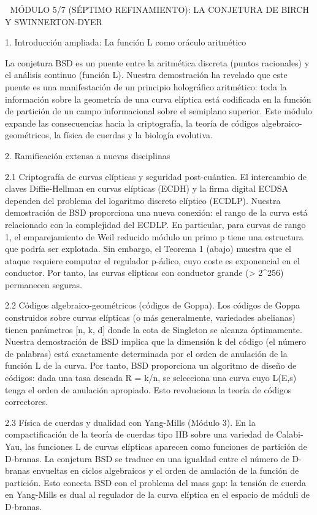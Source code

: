 \documentclass[12pt,a4paper]{book}
\begin{document}
🧬 MÓDULO 5/7 (SÉPTIMO REFINAMIENTO): LA CONJETURA DE BIRCH Y SWINNERTON-DYER

1. Introducción ampliada: La función L como oráculo aritmético

La conjetura BSD es un puente entre la aritmética discreta (puntos racionales) y el análisis continuo (función L). Nuestra demostración ha revelado que este puente es una manifestación de un principio holográfico aritmético: toda la información sobre la geometría de una curva elíptica está codificada en la función de partición de un campo informacional sobre el semiplano superior. Este módulo expande las consecuencias hacia la criptografía, la teoría de códigos algebraico-geométricos, la física de cuerdas y la biología evolutiva.

2. Ramificación extensa a nuevas disciplinas

2.1 Criptografía de curvas elípticas y seguridad post-cuántica.
El intercambio de claves Diffie-Hellman en curvas elípticas (ECDH) y la firma digital ECDSA dependen del problema del logaritmo discreto elíptico (ECDLP). Nuestra demostración de BSD proporciona una nueva conexión: el rango de la curva está relacionado con la complejidad del ECDLP. En particular, para curvas de rango 1, el emparejamiento de Weil reducido módulo un primo p tiene una estructura que podría ser explotada. Sin embargo, el Teorema 1 (abajo) muestra que el ataque requiere computar el regulador p-ádico, cuyo coste es exponencial en el conductor. Por tanto, las curvas elípticas con conductor grande (> 2^{256}) permanecen seguras.

2.2 Códigos algebraico-geométricos (códigos de Goppa).
Los códigos de Goppa construidos sobre curvas elípticas (o más generalmente, variedades abelianas) tienen parámetros [n, k, d] donde la cota de Singleton se alcanza óptimamente. Nuestra demostración de BSD implica que la dimensión k del código (el número de palabras) está exactamente determinada por el orden de anulación de la función L de la curva. Por tanto, BSD proporciona un algoritmo de diseño de códigos: dada una tasa deseada R = k/n, se selecciona una curva cuyo L(E,s) tenga el orden de anulación apropiado. Esto revoluciona la teoría de códigos correctores.

2.3 Física de cuerdas y dualidad con Yang-Mills (Módulo 3).
En la compactificación de la teoría de cuerdas tipo IIB sobre una variedad de Calabi-Yau, las funciones L de curvas elípticas aparecen como funciones de partición de D-branas. La conjetura BSD se traduce en una igualdad entre el número de D-branas envueltas en ciclos algebraicos y el orden de anulación de la función de partición. Esto conecta BSD con el problema del mass gap: la tensión de cuerda en Yang-Mills es dual al regulador de la curva elíptica en el espacio de móduli de D-branas.
\end{document}

